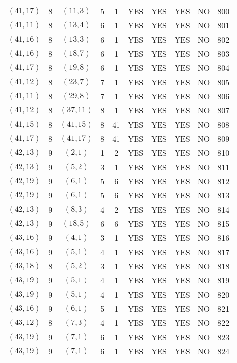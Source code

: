 \begin{longtable}{|c|c|c|c|c|c|c|c|c|c|}
$(41, 17)$ & 8 & $(11, 3)$ & 5 & 1 & YES & YES & YES & NO & 800\\
$(41, 11)$ & 8 & $(13, 4)$ & 6 & 1 & YES & YES & YES & NO & 801\\
$(41, 16)$ & 8 & $(13, 3)$ & 6 & 1 & YES & YES & YES & NO & 802\\
$(41, 16)$ & 8 & $(18, 7)$ & 6 & 1 & YES & YES & YES & NO & 803\\
$(41, 17)$ & 8 & $(19, 8)$ & 6 & 1 & YES & YES & YES & NO & 804\\
$(41, 12)$ & 8 & $(23, 7)$ & 7 & 1 & YES & YES & YES & NO & 805\\
$(41, 11)$ & 8 & $(29, 8)$ & 7 & 1 & YES & YES & YES & NO & 806\\
$(41, 12)$ & 8 & $(37, 11)$ & 8 & 1 & YES & YES & YES & NO & 807\\
$(41, 15)$ & 8 & $(41, 15)$ & 8 & 41 & YES & YES & YES & NO & 808\\
$(41, 17)$ & 8 & $(41, 17)$ & 8 & 41 & YES & YES & YES & NO & 809\\
$(42, 13)$ & 9 & $(2, 1)$ & 1 & 2 & YES & YES & YES & NO & 810\\
$(42, 13)$ & 9 & $(5, 2)$ & 3 & 1 & YES & YES & YES & NO & 811\\
$(42, 19)$ & 9 & $(6, 1)$ & 5 & 6 & YES & YES & YES & NO & 812\\
$(42, 19)$ & 9 & $(6, 1)$ & 5 & 6 & YES & YES & YES & NO & 813\\
$(42, 13)$ & 9 & $(8, 3)$ & 4 & 2 & YES & YES & YES & NO & 814\\
$(42, 13)$ & 9 & $(18, 5)$ & 6 & 6 & YES & YES & YES & NO & 815\\
$(43, 16)$ & 9 & $(4, 1)$ & 3 & 1 & YES & YES & YES & NO & 816\\
$(43, 16)$ & 9 & $(5, 1)$ & 4 & 1 & YES & YES & YES & NO & 817\\
$(43, 18)$ & 8 & $(5, 2)$ & 3 & 1 & YES & YES & YES & NO & 818\\
$(43, 19)$ & 9 & $(5, 1)$ & 4 & 1 & YES & YES & YES & NO & 819\\
$(43, 19)$ & 9 & $(5, 1)$ & 4 & 1 & YES & YES & YES & NO & 820\\
$(43, 16)$ & 9 & $(6, 1)$ & 5 & 1 & YES & YES & YES & NO & 821\\
$(43, 12)$ & 8 & $(7, 3)$ & 4 & 1 & YES & YES & YES & NO & 822\\
$(43, 19)$ & 9 & $(7, 1)$ & 6 & 1 & YES & YES & YES & NO & 823\\
$(43, 19)$ & 9 & $(7, 1)$ & 6 & 1 & YES & YES & YES & NO & 824\\

\end{longtable}
